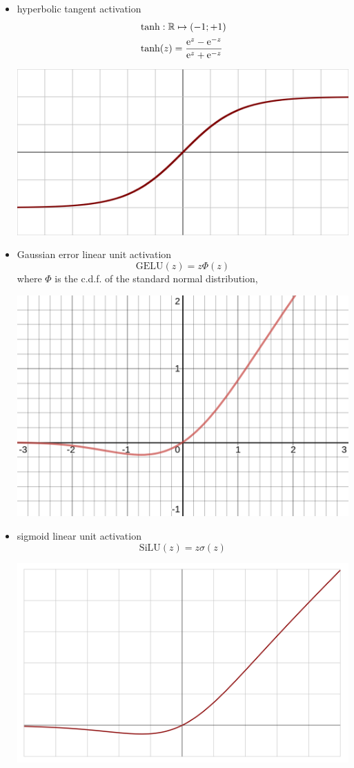 \documentclass{myclass}
\begin{document}
\begin{itemize}
   \item hyperbolic tangent activation
   \[
   \begin{split}
      &\tanh: \mathbb{R} \mapsto (-1;+1)\\
      &\tanh(z) = \frac{\mathrm{e}^{z} - \mathrm{e}^{-z}}{\mathrm{e}^{z} + \mathrm{e}^{-z}}
   \end{split}
   \]
   \begin{center}
   \includegraphics[width=0.5\columnwidth]{figs/Activation_tanh.svg.png}
   \end{center}

   \item Gaussian error linear unit activation
   \[
      \text{GELU}(z) = z \Phi(z)
   \]
   where $\Phi$ is the c.d.f. of the standard normal distribution,
   \begin{center}
   \includegraphics[width=0.5\columnwidth]{figs/Activation_gelu.png}
   \end{center}

   \item sigmoid linear unit activation
   \[
      \text{SiLU}(z) = z \sigma(z)
   \]
   \begin{center}
   \includegraphics[width=0.5\columnwidth]{figs/Activation_Swish.svg.png}
   \end{center}

\end{itemize}
\end{document}
